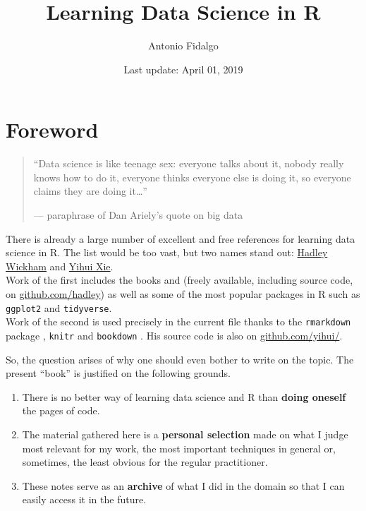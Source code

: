 \documentclass[]{book}
\title{Learning Data Science in R}
\author{Antonio Fidalgo}
\date{Last update: April 01, 2019}
\providecommand{\tightlist}{%
  \setlength{\itemsep}{0pt}\setlength{\parskip}{0pt}}
\theoremstyle{definition}
\theoremstyle{definition}
\theoremstyle{definition}
\theoremstyle{remark}
\begin{document}
\maketitle

{
\setcounter{tocdepth}{1}
\tableofcontents
}
\hypertarget{foreword}{%
\chapter*{Foreword}\label{foreword}}

\begin{quote}
``Data science is like teenage sex: everyone talks about it, nobody
really knows how to do it, everyone thinks everyone else is doing it, so
everyone claims they are doing it\ldots{}''

--- paraphrase of Dan Ariely's quote on big data
\end{quote}

There is already a large number of excellent and free references for
learning data science in R. The list would be too vast, but two names
stand out: \href{http://hadley.nz/}{Hadley Wickham} and
\href{https://yihui.name/en/about/}{Yihui Xie}.\\
Work of the first includes the books \citet{wickham2016} and
\citet{wickham2014} (freely available, including source code, on
\href{https://github.com/hadley}{github.com/hadley}) as well as some of
the most popular packages in R such as \texttt{ggplot2}
\citep{R-ggplot2} and \texttt{tidyverse}\citep{R-tidyverse}.\\
Work of the second is used precisely in the current file thanks to the
\texttt{rmarkdown} package \citep{R-rmarkdown}, \texttt{knitr}
\citep{R-knitr} and \texttt{bookdown} \citep{R-bookdown}. His source
code is also on \href{https://github.com/yihui/}{github.com/yihui/}.

So, the question arises of why one should even bother to write on the
topic. The present ``book'' is justified on the following grounds.

\begin{enumerate}
\def\labelenumi{\arabic{enumi}.}
\tightlist
\item
  There is no better way of learning data science and R than
  \textbf{doing oneself} the pages of code.\\
\item
  The material gathered here is a \textbf{personal selection} made on
  what I judge most relevant for my work, the most important techniques
  in general or, sometimes, the least obvious for the regular
  practitioner.\\
\item
  These notes serve as an \textbf{archive} of what I did in the domain
  so that I can easily access it in the future.
\end{enumerate}
\end{document}
